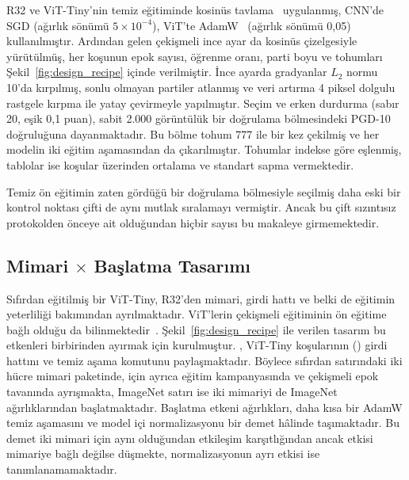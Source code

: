 R32 ve ViT-Tiny'nin temiz eğitiminde kosinüs tavlama~\cite{loshchilov2016sgdr} uygulanmış, CNN'de SGD (ağırlık sönümü $5\times10^{-4}$), ViT'te AdamW~\cite{loshchilov2017decoupled} (ağırlık sönümü 0{,}05) kullanılmıştır. Ardından gelen çekişmeli ince ayar da kosinüs çizelgesiyle yürütülmüş, her koşunun epok sayısı, öğrenme oranı, parti boyu ve tohumları Şekil~\ref{fig:design_recipe} içinde verilmiştir. İnce ayarda gradyanlar $L_2$ normu 10'da kırpılmış, sonlu olmayan partiler atlanmış ve veri artırma 4 piksel dolgulu rastgele kırpma ile yatay çevirmeyle yapılmıştır. Seçim ve erken durdurma (sabır 20, eşik 0{,}1 puan), sabit 2.000 görüntülük bir doğrulama bölmesindeki PGD-10 doğruluğuna dayanmaktadır. Bu bölme tohum 777 ile bir kez çekilmiş ve her modelin iki eğitim aşamasından da çıkarılmıştır. Tohumlar indekse göre eşlenmiş, tablolar ise koşular üzerinden ortalama ve standart sapma vermektedir.

Temiz ön eğitimin zaten gördüğü bir doğrulama bölmesiyle seçilmiş daha eski bir kontrol noktası çifti de aynı mutlak sıralamayı vermiştir. Ancak bu çift sızıntısız protokolden önceye ait olduğundan hiçbir sayısı bu makaleye girmemektedir.

\subsection{Mimari \texorpdfstring{$\times$}{x} Başlatma Tasarımı}
\label{subsec:design}

Sıfırdan eğitilmiş bir ViT-Tiny, R32'den mimari, girdi hattı ve belki de eğitimin yeterliliği bakımından ayrılmaktadır. ViT'lerin çekişmeli eğitiminin ön eğitime bağlı olduğu da bilinmektedir~\cite{mo2022adversarial}. Şekil~\ref{fig:design_recipe} ile verilen tasarım bu etkenleri birbirinden ayırmak için kurulmuştur. , ViT-Tiny koşularının () girdi hattını ve temiz aşama komutunu paylaşmaktadır. Böylece sıfırdan satırındaki iki hücre mimari paketinde,  için ayrıca eğitim kampanyasında ve çekişmeli epok tavanında ayrışmakta, ImageNet satırı ise iki mimariyi de ImageNet ağırlıklarından başlatmaktadır. Başlatma etkeni ağırlıkları, daha kısa bir AdamW temiz aşamasını ve model içi normalizasyonu bir demet hâlinde taşımaktadır. Bu demet iki mimari için aynı olduğundan etkileşim karşıtlığından ancak etkisi mimariye bağlı değilse düşmekte, normalizasyonun ayrı etkisi ise tanımlanamamaktadır.

